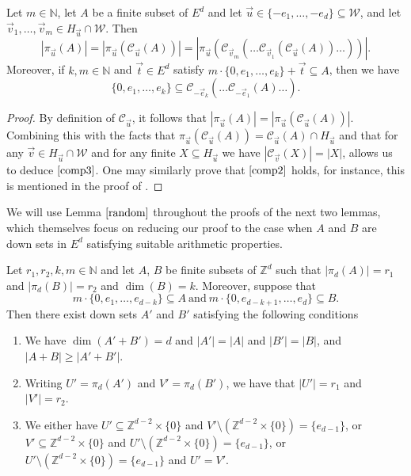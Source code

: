 \begin{lemma} \label{random}
Let $m \in \mathbb{N}$, let $A$ be a finite subset of $E^d$ and let $\vec{u} \in \{-e_1, \dots, -e_d\} \subseteq \mathcal{W}$, and let $\vec{v}_1, \dots, \vec{v}_m \in H_{\vec{u}} \cap \mathcal{W}$. Then
\begin{equation} \label{comp3}
  |\pi_{\vec{u}}(A)| =  |\pi_{\vec{u}}(\mathcal{C}_{\vec{u}} (A))| = |\pi_{\vec{u}}(  \mathcal{C}_{\vec{v}_m}( \dots  \mathcal{C}_{\vec{v}_1}(\mathcal{C}_{\vec{u}} (A)) \dots ))|.
  \end{equation}
Moreover, if $k, m \in \mathbb{N}$ and $\vec{t} \in E^d$ satisfy $m \cdot \{0, e_1, \dots, e_k\} + \vec{t} \subseteq A$, then we have
\begin{equation} \label{comp2}
\{0, e_1, \dots, e_k\} \subseteq \mathcal{C}_{-\vec{e}_k}( \dots  \mathcal{C}_{-\vec{e}_1}(A) \dots ). \end{equation}
\end{lemma}

\begin{proof}
By definition of $\mathcal{C}_{\vec{u}}$, it follows that $|\pi_{\vec{u}}(A)| = |\pi_{\vec{u}}(\mathcal{C}_{\vec{u}} (A))|$. Combining this with the facts that $\pi_{\vec{u}}(\mathcal{C}_{\vec{u}}(A)) = \mathcal{C}_{\vec{u}}(A) \cap H_{\vec{u}}$ and that for any $\vec{v} \in H_{\vec{u}} \cap \mathcal{W}$ and for any finite $X \subseteq H_{\vec{u}}$ we have $|\mathcal{C}_{\vec{v}}(X)| = |X|$, allows us to deduce $\eqref{comp3}$. One may similarly prove that $\eqref{comp2}$ holds, for instance, this is mentioned in the proof of \cite[Corollary $2.6$]{GG2001}.
\end{proof}

We will use Lemma $\ref{random}$ throughout the proofs of the next two lemmas, which themselves focus on reducing our proof to the case when $A$ and $B$ are down sets in $E^d$ satisfying suitable arithmetic properties. 

\begin{lemma} \label{cmp1}
Let $r_1, r_2, k, m \in \mathbb{N}$ and let $A$, $B$ be  finite subsets of $\mathbb{Z}^d$ such that $|\pi_{d}(A)| = r_1$ and $|\pi_{d}(B)| = r_2$ and $\dim(B) = k$. Moreover, suppose that
\[ m \cdot \{0, e_1, \dots, e_{d-k}\} \subseteq A \ \text{and} \ m \cdot \{0,e_{d-k+1}, \dots, e_d\} \subseteq B. \]
Then there exist down sets $A'$ and $B'$ satisfying the following conditions
\begin{enumerate}
 \item We have $\dim(A'+B') = d$ and $|A'| = |A|$ and $|B'| = |B|$, and $|A+B| \geq |A' + B'|.$ 
 \item Writing $U' = \pi_{d}(A')$ and $V' = \pi_{d}(B')$, we have that $|U'| = r_1$ and $|V'| = r_2$. 
 \item We either have $U' \subseteq \mathbb{Z}^{d-2} \times \{0\}$ and $V' \setminus (\mathbb{Z}^{d-2} \times \{0\}) = \{e_{d-1}\}$, or $V' \subseteq \mathbb{Z}^{d-2} \times \{0\}$ and $U' \setminus (\mathbb{Z}^{d-2} \times \{0\}) = \{e_{d-1}\}$, or $U' \setminus (\mathbb{Z}^{d-2} \times \{0\}) =  \{e_{d-1}\}$ and $U'= V'$.
 \end{enumerate}
\end{lemma}

